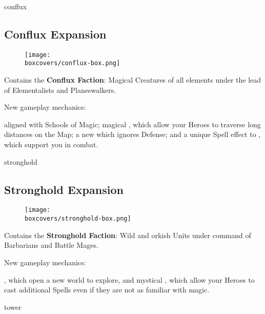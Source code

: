 \begin{multicols}{2}
\begin{expansion}[title=]{conflux}
  \subsection*{\color{conflux}Conflux Expansion}
  \setlength\intextsep{0pt}
  \setlength\columnsep{0.8em}
  \begin{wrapfigure}{l}{0.35\textwidth}
    \texttt{[image: \\boxcovers/conflux-box.png]}
  \end{wrapfigure}
  Contains the \textbf{Conflux Faction}: Magical Creatures of all elements under the lead of Elementalists and Planeswalkers.\par
  \medskip
  New gameplay mechanics:\par
  \smallskip
   aligned with Schools of Magic; magical , which allow your Heroes to traverse long distances on the Map; a new  which ignores Defense; and a unique Spell effect to , which support you in combat.  %
\end{expansion}
\vspace*{\fill}

\columnbreak
\begin{expansion}[title=]{stronghold}
  \subsection*{\color{stronghold}Stronghold Expansion}
  \setlength\intextsep{0pt}
  \setlength\columnsep{0.8em}
  \begin{wrapfigure}{l}{0.35\textwidth}
    \texttt{[image: \\boxcovers/stronghold-box.png]}
  \end{wrapfigure}
  Contains the \textbf{Stronghold Faction}: Wild and orkish Units under command of Barbarians and Battle Mages.\par
  \medskip
  New gameplay mechanics:\par
  \smallskip
  , which open a new world to explore, and mystical ,
  which allow your Heroes to cast additional Spells even if they are not as familiar with magic.
\end{expansion}

\vspace*{1em}
\begin{expansion}[title=]{tower}

\end{expansion}
\end{multicols}
